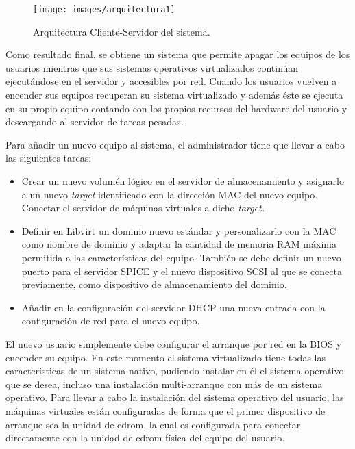 \documentclass[spanisheDIVcalc,twoside,parskip-,pointlessnumbers,final]{scrbook}
\begin{document}
\begin{figure}[htpb]
\begin{raggedright}
\texttt{[image: images/arquitectura1]}
\par\end{raggedright}

\caption{Arquitectura Cliente-Servidor del sistema.}
\label{Arquitectura cliente-servidor del sistema}
\end{figure}


Como resultado final, se obtiene un sistema que permite apagar los
equipos de los usuarios mientras que sus sistemas operativos virtualizados
continúan ejecutándose en el servidor y accesibles por red. Cuando
los usuarios vuelven a encender sus equipos recuperan su sistema virtualizado
y además éste se ejecuta en su propio equipo contando con los propios
recursos del hardware del usuario y descargando al servidor de tareas
pesadas.

Para añadir un nuevo equipo al sistema, el administrador tiene que
llevar a cabo las siguientes tareas:
\begin{itemize}
\item Crear un nuevo volumén lógico en el servidor de almacenamiento y asignarlo
a un nuevo \emph{target }identificado con la dirección MAC del nuevo
equipo. Conectar el servidor de máquinas virtuales a dicho \emph{target.} 
\item Definir en Libvirt un dominio nuevo estándar y personalizarlo con
la MAC como nombre de dominio y adaptar la cantidad de memoria RAM
máxima permitida a las características del equipo. También se debe
definir un nuevo puerto para el servidor SPICE y el nuevo dispositivo
SCSI al que se conecta previamente, como dispositivo de almacenamiento
del dominio.
\item Añadir en la configuración del servidor DHCP una nueva entrada con
la configuración de red para el nuevo equipo.
\end{itemize}
El nuevo usuario simplemente debe configurar el arranque por red en
la BIOS y encender su equipo. En este momento el sistema virtualizado
tiene todas las características de un sistema nativo, pudiendo instalar
en él el sistema operativo que se desea, incluso una instalación multi-arranque
con más de un sistema operativo. Para llevar a cabo la instalación
del sistema operativo del usuario, las máquinas virtuales están configuradas
de forma que el primer dispositivo de arranque sea la unidad de cdrom,
la cual es configurada para conectar directamente con la unidad de
cdrom física del equipo del usuario.
\end{document}
